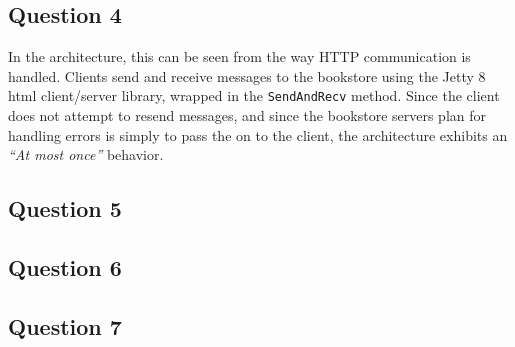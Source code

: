 \subsection{Question 4}

In the architecture, this can be seen from the way HTTP communication is handled. Clients send and receive messages to the bookstore using the Jetty 8 html client/server library, wrapped in the {\tt SendAndRecv} method. Since the client does not attempt to resend messages, and since the bookstore servers plan for handling errors is simply to pass the on to the client, the architecture exhibits an {\it ``At most once''} behavior.

\subsection{Question 5}

\subsection{Question 6}

\subsection{Question 7}


